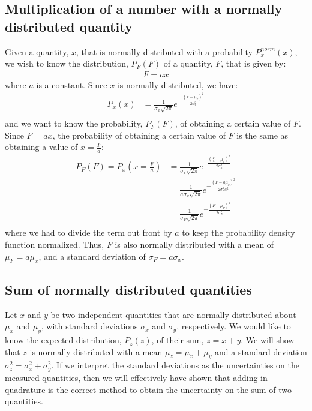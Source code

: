 \subsection{Multiplication of a number with a normally distributed quantity}
Given a quantity, $x$, that is normally distributed with a probability $P^{norm}_x(x)$, we wish to know the distribution, $P_F(F)$ of a quantity, $F$, that is given by:
\begin{align*}
F=ax
\end{align*}
where $a$ is a constant. Since $x$ is normally distributed, we have:
\begin{align*}
P_x(x)&=\frac{1}{\sigma_x\sqrt{2\pi}}e^{-\frac{(x-\mu_x)^2}{2\sigma_x^2}}\\
\end{align*}
and we want to know the probability, $P_F(F)$, of obtaining a certain value of $F$. Since $F=ax$, the probability of obtaining a certain value of $F$ is the same as obtaining a value of $x=\frac{F}{a}$:
\begin{align}
\label{eqn:normmultconstant}
P_F(F)=P_x(x=\frac{F}{a})&=\frac{1}{\sigma_x\sqrt{2\pi}}e^{-\frac{(\frac{F}{a}-\mu_x)^2}{2\sigma_x^2}}\\
&=\frac{1}{a\sigma_x\sqrt{2\pi}}e^{-\frac{(F-a\mu_x)^2}{2\sigma_x^2a^2}}\\
&=\frac{1}{\sigma_F\sqrt{2\pi}}e^{-\frac{(F-\mu_F)^2}{2\sigma_F^2}}\\
\end{align}
where we had to divide the term out front by $a$ to keep the probability density function normalized. Thus, $F$ is also normally distributed with a mean of $\mu_F=a\mu_x$, and a standard deviation of $\sigma_F=a\sigma_x$.  

\subsection{Sum of normally distributed quantities}
Let $x$ and $y$ be two independent quantities that are normally distributed about $\mu_x$ and $\mu_y$, with standard deviations $\sigma_x$ and $\sigma_y$, respectively. We would like to know the expected distribution, $P_z(z)$, of their sum, $z=x+y$. We will show that $z$ is normally distributed with a mean $\mu_z=\mu_x+\mu_y$ and a standard deviation $\sigma_z^2=\sigma_x^2+\sigma_y^2$. If we interpret the standard deviations as the uncertainties on the measured quantities, then we will effectively have shown that adding in quadrature is the correct method to obtain the uncertainty on the sum of two quantities.

